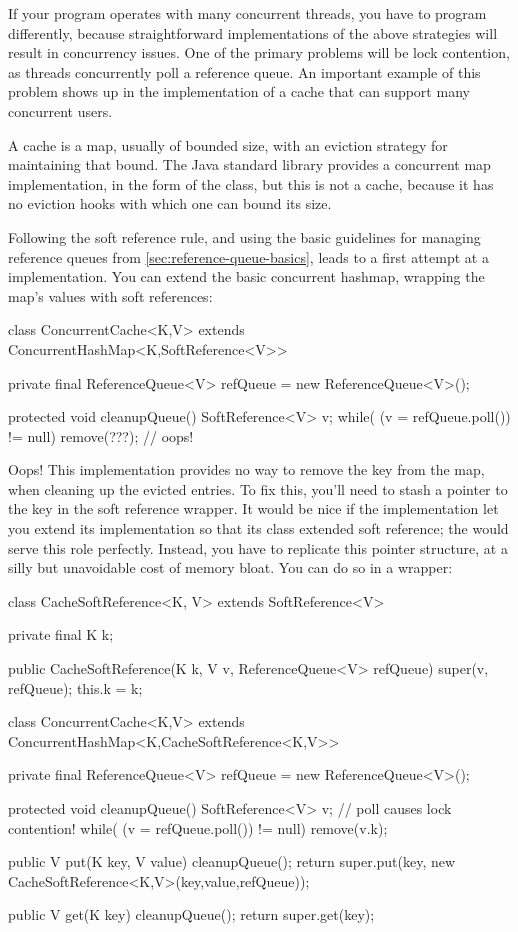 If your program operates with many concurrent threads, you have to program
differently, because straightforward implementations of the above strategies will
result in concurrency issues. One of the primary problems will be lock
contention, as threads concurrently poll a reference queue. An important example
of this problem shows up in the implementation of a cache that can support many
concurrent users.

A cache is a map, usually of bounded size, with an eviction strategy for
maintaining that bound. The Java standard library provides a
concurrent map implementation, in the form of the 
class, but this is not a cache, because it has no eviction hooks with which one
can bound its size.

Following the soft reference rule, and using the basic guidelines for managing
reference queues from \autoref{sec:reference-queue-basics}, leads to a first
attempt at a  implementation. You can extend the basic
concurrent hashmap, wrapping the map's values with soft references:
\begin{shortlisting}
class ConcurrentCache<K,V> extends ConcurrentHashMap<K,SoftReference<V>> {
   private final ReferenceQueue<V> refQueue = new ReferenceQueue<V>();
   
   protected void cleanupQueue() {
      SoftReference<V> v;
      while( (v = refQueue.poll()) != null) {
         remove(???); // oops!
      }
   }
}
\end{shortlisting}
Oops! This implementation provides no way to remove the key from the map, when
cleaning up the evicted entries. To fix this, you'll need to stash a pointer to
the key in the soft reference wrapper. It would be nice if the
 implementation let you extend
its implementation so that its  class extended soft reference;
the  would serve this role perfectly. Instead, you have to
replicate this pointer structure, at a silly but unavoidable cost of memory
bloat. You can do so in a  wrapper:
\begin{shortlisting}
class CacheSoftReference<K, V> extends SoftReference<V> {
   private final K k;
   
   public CacheSoftReference(K k, V v, ReferenceQueue<V> refQueue) {
      super(v, refQueue);
      this.k = k;
   }
}

class ConcurrentCache<K,V> extends ConcurrentHashMap<K,CacheSoftReference<K,V>> {
   private final ReferenceQueue<V> refQueue = new ReferenceQueue<V>();
   
   protected void cleanupQueue() {
      SoftReference<V> v;
      // poll causes lock contention!
      while( (v = refQueue.poll()) != null) {
         remove(v.k);
      }
   }
   
   public V put(K key, V value) {
      cleanupQueue();
      return super.put(key, new CacheSoftReference<K,V>(key,value,refQueue));
   }
   
   public V get(K key) {
      cleanupQueue();
      return super.get(key);
   }
}
\end{shortlisting}
